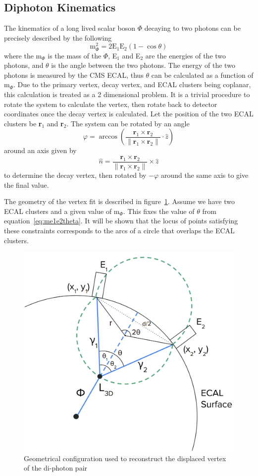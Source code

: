 \subsection{Diphoton Kinematics} \label{sec:vertex_calc}
The kinematics of a long lived scalar boson $\Phi$ decaying to two photons can be precisely described by the following
\begin{equation}\label{eq:me1e2theta}
	\text{m}_{\Phi}^2 = 2\text{E}_1\text{E}_2(1-\cos\theta)
\end{equation}
where the m$_\Phi$ is the mass of the $\Phi$, E$_1$ and E$_2$ are the energies of the two photons, and $\theta$ is the angle between the two photons. The energy of the two photons is measured by the CMS ECAL, thus $\theta$ can be calculated as a function of m$_\Phi$. Due to the primary vertex, decay vertex, and ECAL clusters being coplanar, this calculation is treated as a 2 dimensional problem. It is a trivial procedure to rotate the system to calculate the vertex, then rotate back to detector coordinates once the decay vertex is calculated. Let the position of the two ECAL clusters be \textbf{r$_1$} and \textbf{r$_2$}. The system can be rotated by an angle
\begin{equation} \label{eq:rot_angle}
	\varphi=\arccos\left(\frac{\textbf{r}_1\times\textbf{r}_2}{\|\textbf{r}_1\times\textbf{r}_2\|}\cdot\hat{z}\right)
\end{equation}
around an axis given by 
\begin{equation} \label{eq:rot_axis}
	\hat{n}=\frac{\textbf{r}_1\times\textbf{r}_2}{\|\textbf{r}_1\times\textbf{r}_2\|}\times\hat{z}
\end{equation}
to determine the decay vertex, then rotated by $-\varphi$ around the same axis to give the final value.

The geometry of the vertex fit is described in figure~\ref{fig:vertex_diagram}. Assume we have two ECAL clusters and a given value of m$_\Phi$. This fixes the value of $\theta$ from equation~\ref{eq:me1e2theta}. It will be shown that the locus of points satisfying these constraints corresponds to the arcs of a circle that overlaps the ECAL clusters.

\begin{figure}[htb]
	\centering
	\includegraphics[width=0.65\linewidth]{figs/05_analysis/vertexfit_diagram.png}
	\caption{Geometrical configuration used to reconstruct the displaced vertex of the di-photon pair}
	\label{fig:vertex_diagram}
\end{figure}

